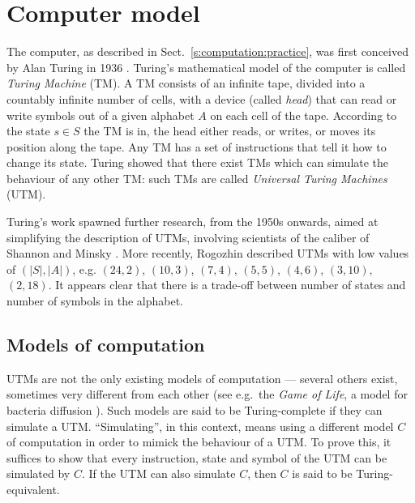 \documentclass[a4paper]{book}
\theoremstyle{changebreak}                %
\begin{document}
\section{Computer model}
\label{s:computation:theory}
The computer, as described in Sect.~\ref{s:computation:practice}, was
first conceived by Alan Turing in 1936 \cite{turing}.
Turing's mathematical model of the computer is called {\it Turing
  Machine} (TM). A TM consists of an
infinite tape, divided into a countably infinite number of
cells, with a device (called {\it head}) that
can read or write symbols out of a given alphabet
$A$ on each cell of the tape. According to the state
$s\in S$ the TM is in, the head either reads, or writes, or moves its
position along the tape. Any TM has a set of instructions that tell it
how to change its state. Turing showed that there exist TMs which can
simulate the behaviour of any other TM: such TMs are called {\it
  Universal Turing
  Machines}
   (UTM).

Turing's work spawned further research, from the 1950s onwards, aimed
at simplifying the description of UTMs, involving scientists of
the caliber of Shannon \cite{shannonUTM} and
Minsky \cite{minskyUTM}. More recently,
Rogozhin \cite{roghozin} described UTMs with low
values of $(|S|,|A|)$, e.g. $(24,2)$, $(10,3)$, $(7,4)$, $(5,5)$,
$(4,6)$, $(3,10)$, $(2,18)$. It appears clear that there is a
trade-off between number of states and number of
symbols in the alphabet.

\subsection{Models of computation}
\label{s:computation:models}
UTMs are not the only existing models of computation --- several others exist, sometimes very different from
each other (see e.g.~the {\it Game of Life}, a
model for bacteria diffusion \cite{gameoflife}). Such models are said
to be Turing-complete if they can
simulate a UTM. ``Simulating'', in this context,
means using a different model $C$ of computation in order to mimick
the behaviour of a UTM. To prove this, it suffices to show that every
instruction, state and symbol of the UTM can be simulated by $C$. If
the UTM can also simulate $C$, then $C$ is said to be
Turing-equivalent.
\end{document}
